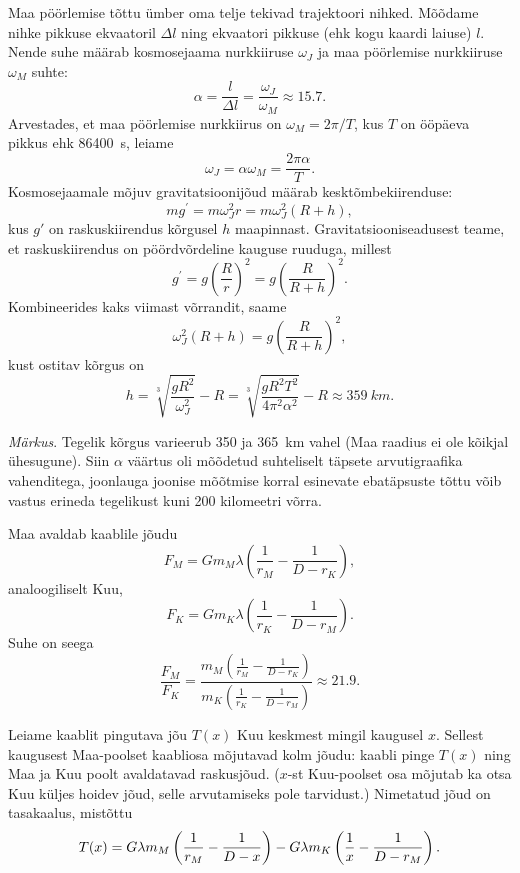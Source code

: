 \documentclass[10pt, twoside]{article}
\begin{document}
{
\solu
Maa pöörlemise tõttu ümber oma telje tekivad trajektoori nihked. Mõõdame nihke pikkuse ekvaatoril $\Delta l$ ning ekvaatori pikkuse (ehk kogu kaardi laiuse) $l$. Nende suhe määrab kosmosejaama nurkkiiruse $\omega_J$ ja maa pöörlemise nurkkiiruse $\omega_M$ suhte:
\[
\alpha=\frac{l}{\Delta l}=\frac{\omega_{J}}{\omega_{M}} \approx \num{15,7}.
\]
Arvestades, et maa pöörlemise nurkkiirus on $\omega_M = 2\pi /T$, kus $T$ on ööpäeva pikkus ehk \SI{86400}{s}, leiame
\[
\omega_J = \alpha \omega_M = \frac{2\pi\alpha}{T}.
\]
Kosmosejaamale mõjuv gravitatsioonijõud määrab kesktõmbekiirenduse:
\[
m g^{\prime}= m\omega_J^2 r = m \omega_{J}^{2}(R+h),
\]
kus $g'$ on raskuskiirendus kõrgusel $h$ maapinnast. Gravitatsiooniseadusest teame, et raskuskiirendus on pöördvõrdeline kauguse ruuduga, millest
\[
g^{\prime}= g\left(\frac{R}{r}\right)^2 = g\left(\frac{R}{R+h}\right)^{2}.
\]
Kombineerides kaks viimast võrrandit, saame
\[
\omega_{J}^{2}(R+h)=g\left(\frac{R}{R+h}\right)^{2},
\]
kust ostitav kõrgus on
\[
h=\sqrt[3]{\frac{g R^{2}}{\omega_{J}^{2}}}-R=\sqrt[3]{\frac{g R^{2} T^{2}}{4 \pi^{2} \alpha^{2}}}-R \approx \SI{359}{km}.
\]

\emph{Märkus}. Tegelik kõrgus varieerub \num{350} ja \SI{365}{km} vahel (Maa raadius ei ole kõikjal ühesugune). Siin $\alpha$ väärtus oli mõõdetud suhteliselt täpsete arvutigraafika vahenditega, joonlauga joonise mõõtmise korral esinevate ebatäpsuste tõttu võib vastus erineda tegelikust kuni \num{200} kilomeetri võrra.
\probend
\bigskip


\solu
\osa
Maa avaldab kaablile jõudu
\[ 
F_M = G m_M \lambda \left( \frac{1}{r_M} - \frac{1}{D - r_K} \right),
\]
analoogiliselt Kuu,
\[ 
F_K = G m_K \lambda \left( \frac{1}{r_K} - \frac{1}{D - r_M} \right).
\]
Suhe on seega
\[ \frac{F_M}{F_K} = \frac{ m_M \left( \frac{1}{r_M} - \frac{1}{D -
		r_K} \right) }{ m_K \left( \frac{1}{r_K} - \frac{1}{D - r_M} \right) } \approx
\num{21,9}.\]

\osa
Leiame kaablit pingutava jõu $T(x)$ Kuu keskmest mingil kaugusel $x$. Sellest
kaugusest Maa-poolset kaabliosa mõjutavad kolm jõudu: kaabli pinge $T(x)$ ning
Maa ja Kuu poolt avaldatavad raskusjõud. ($x$-st Kuu-poolset osa mõjutab ka
otsa Kuu küljes hoidev jõud, selle arvutamiseks pole tarvidust.) Nimetatud jõud on
tasakaalus, mistõttu
\[ 
T(x) = G\lambda m_M \left( \frac{1}{r_M} - \frac{1}{D-x} \right) -
G\lambda m_K \left( \frac{1}{x} - \frac{1}{D-r_M} \right) \text. 
\]

}
\end{document}

